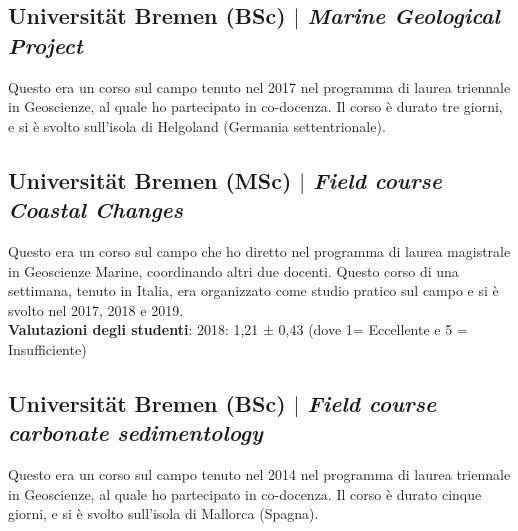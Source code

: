 \documentclass[11pt]{article}
\begin{document}
\subsection{Universität Bremen (BSc) $|$ {\normalfont\textit{Marine Geological Project}}}
{\footnotesize Questo era un corso sul campo tenuto nel 2017 nel programma di laurea triennale in Geoscienze, al quale ho partecipato in co-docenza. Il corso è durato tre giorni, e si è svolto sull'isola di Helgoland (Germania settentrionale).}
\bigskip

\subsection{Universität Bremen (MSc) $|$ {\normalfont\textit{Field course Coastal Changes}}}
{\footnotesize Questo era un corso sul campo che ho diretto nel programma di laurea magistrale in Geoscienze Marine, coordinando altri due docenti. Questo corso di una settimana, tenuto in Italia, era organizzato come studio pratico sul campo e si è svolto nel 2017, 2018 e 2019.\\
\textbf{Valutazioni degli studenti}:
2018: 1,21 ± 0,43 (dove 1= Eccellente e 5 = Insufficiente)}
\bigskip

\subsection{Universität Bremen (BSc) $|$ {\normalfont\textit{Field course carbonate sedimentology}}}
{\footnotesize Questo era un corso sul campo tenuto nel 2014 nel programma di laurea triennale in Geoscienze, al quale ho partecipato in co-docenza. Il corso è durato cinque giorni, e si è svolto sull'isola di Mallorca (Spagna).}
\bigskip
\end{document}
